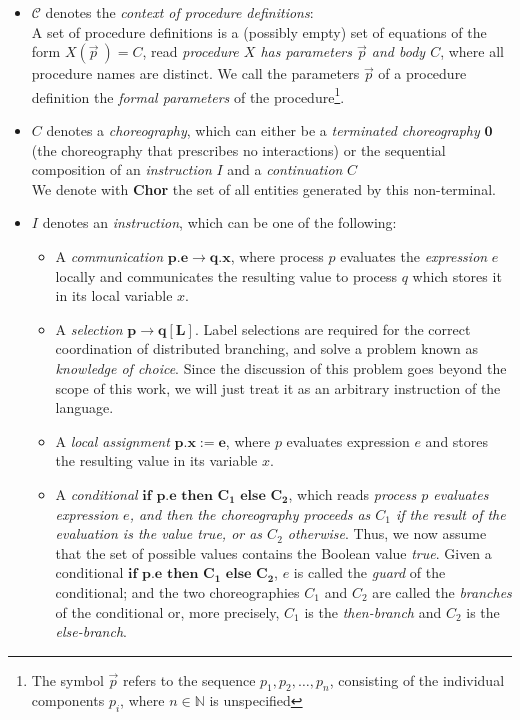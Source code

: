 \documentclass[12pt,a4paper,twoside]{book}
\begin{document}
\begin{itemize}
\item $\mathscr{C}$ denotes the \textit{context of procedure definitions}:\\
	A set of procedure definitions is a (possibly empty) set of equations of the form $X(\vec{p}~) = C$, read \textit{procedure $X$ has parameters $\vec{p}$ and body $C$}, where all procedure names are distinct. We call the parameters $\vec{p}$ of a procedure definition the \textit{formal parameters} of the procedure\footnote{The symbol \( \vec{p} \) refers to the sequence \( p_1, p_2, \dots, p_n \), consisting of the individual components \( p_i \), where \( n \in \mathbb{N} \) is unspecified}.
\item $C$ denotes a \textit{choreography}, which can either be a \textit{terminated choreography} $\boldsymbol{0}$ (the choreography that prescribes no interactions) or the sequential composition of an \textit{instruction} $I$ and a \textit{continuation} $C$\\
We denote with \textbf{Chor} the set of all entities generated by this non-terminal.
\item $I$ denotes an \textit{instruction}, which can be one of the following:
\begin{itemize}
	\item A \emph{communication} $\bm{p.e \rightarrow q.x}$, where process $p$ evaluates the \emph{expression} $e$ locally and communicates the resulting value to process $q$ which stores it in its local variable $x$.
	\item A \emph{selection} $\bm{p \rightarrow q[L]}$.
		Label selections are required for the correct coordination of distributed branching, and solve a problem known as \emph{knowledge of choice}\cite{castagna2012global}. Since the discussion of this problem goes 
beyond the scope of this work, we will just treat it as an arbitrary instruction of the language.
	\item A \emph{local assignment} $\bm{p.x := e}$, where $p$ evaluates expression $e$ and stores the resulting value in its variable $x$.
	\item A \emph{conditional} $\bm{\textbf{if } p.e \textbf{ then } C_1 \textbf{ else } C_2}$, which reads \textit{process $p$ evaluates expression $e$, and then the choreography proceeds as $C_1$ if the result of the evaluation is the value \textit{true}, or as $C_2$ otherwise}. Thus, we now assume that the set of possible values contains the Boolean value \textit{true}. Given a conditional $\bm{\textbf{if } p.e \textbf{ then } C_1 \textbf{ else } C_2}$, $e$ is called the \textit{guard} of the conditional; and the two choreographies $C_1$ and $C_2$ are called the \textit{branches} of the conditional or, more precisely, $C_1$ is the \textit{then-branch} and $C_2$ is the \textit{else-branch}.

\end{itemize}
\end{itemize}
\end{document}

